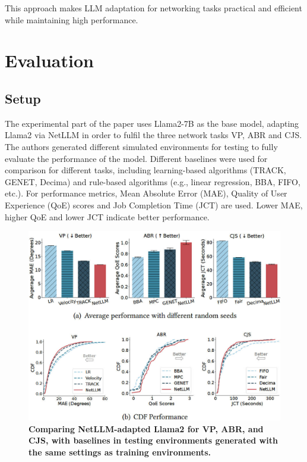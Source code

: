 \documentclass[twocolumn]{article}
\begin{document}
This approach makes LLM adaptation for networking tasks practical and efficient while maintaining high performance.

\section{Evaluation}

\subsection{Setup}
The experimental part of the paper uses Llama2-7B as the base model, adapting Llama2 via NetLLM in order to fulfil the three network tasks VP, ABR and CJS. The authors generated different simulated environments for testing to fully evaluate the performance of the model. Different baselines were used for comparison for different tasks, including learning-based algorithms (TRACK, GENET, Decima) and rule-based algorithms (e.g., linear regression, BBA, FIFO, etc.). For performance metrics, Mean Absolute Error (MAE), Quality of User Experience (QoE) scores and Job Completion Time (JCT) are used. Lower MAE, higher QoE and lower JCT indicate better performance.

\begin{figure}[t]
  \centering
  \includegraphics[width=1\linewidth]{img/figure5.jpg}
  \caption{\textbf{Comparing NetLLM-adapted Llama2 for VP, ABR, and CJS, with baselines in testing environments generated with the same settings as training environments.}}
  \label{fig:5}
\end{figure}
\end{document}
